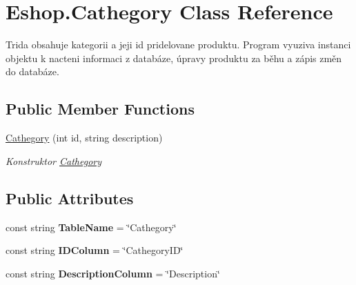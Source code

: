 \hypertarget{class_eshop_1_1_cathegory}{}\section{Eshop.\+Cathegory Class Reference}
\label{class_eshop_1_1_cathegory}


Trida obsahuje kategorii a jeji id pridelovane produktu. Program vyuziva instanci objektu k nacteni informaci z databáze, úpravy produktu za běhu a zápis změn do databáze.  


\subsection*{Public Member Functions}
\begin{DoxyCompactItemize}
\item 
\mbox{\hyperlink{class_eshop_1_1_cathegory_a7902b675f8900a7e1ce986e439e46ddb}{Cathegory}} (int id, string description)
\begin{DoxyCompactList}\small\item\em Konstruktor \mbox{\hyperlink{class_eshop_1_1_cathegory}{Cathegory}} \end{DoxyCompactList}\end{DoxyCompactItemize}
\subsection*{Public Attributes}
\begin{DoxyCompactItemize}
\item 
\mbox{\label{class_eshop_1_1_cathegory_a118dd4e1ed9c9a5130eef0b5adda0c09}} 
const string {\bfseries Table\+Name} = \char`\"{}Cathegory\char`\"{}
\item 
\mbox{\label{class_eshop_1_1_cathegory_a282529bff98613d9009c8b32f6ae421a}} 
const string {\bfseries I\+D\+Column} = \char`\"{}Cathegory\+ID\char`\"{}
\item 
\mbox{\label{class_eshop_1_1_cathegory_a579b4dab681365b171c2f57af173cd21}} 
const string {\bfseries Description\+Column} = \char`\"{}Description\char`\"{}
\end{DoxyCompactItemize}
